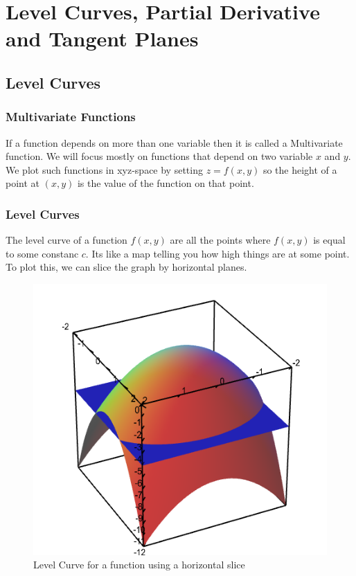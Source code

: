 

\chapter{Level Curves, Partial Derivative and Tangent Planes}

\bigbreak
\section{Level Curves}

\subsection{Multivariate Functions}

If a function depends on more than one variable then it is called a Multivariate function.
We will focus mostly on functions that depend on two variable $x$ and $y$.
We plot such functions in xyz-space by setting $z = f(x, y)$ so the height of a point at $(x, y)$ is the value of the function on that point.

\subsection{Level Curves}

The level curve of a function $f(x, y)$ are all the points where $f(x, y)$ is equal to some constanc $c$.
Its like a map telling you how high things are at some point.
To plot this, we can slice the graph by horizontal planes. 


\begin{figure}[ht!]
    \centering
    \includegraphics[scale=0.5]{./images/lecture_3_figure_1.png}
    \caption{Level Curve for a function using a horizontal slice}
\end{figure}

